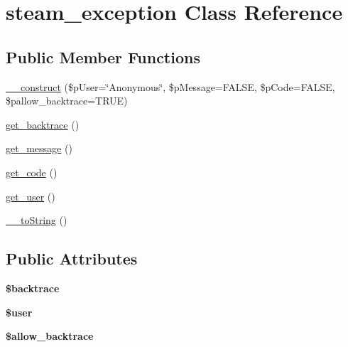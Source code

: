 \hypertarget{classsteam__exception}{
\section{steam\_\-exception Class Reference}
\label{classsteam__exception}
}
\subsection*{Public Member Functions}
\begin{DoxyCompactItemize}
\item 
\hyperlink{classsteam__exception_a3acc3ed126fa62c871ec35e678db876d}{\_\-\_\-construct} (\$pUser=\char`\"{}Anonymous\char`\"{}, \$pMessage=FALSE, \$pCode=FALSE, \$pallow\_\-backtrace=TRUE)
\item 
\hyperlink{classsteam__exception_a5af8080bfb7cc7e0e09e5b9cc16b5848}{get\_\-backtrace} ()
\item 
\hyperlink{classsteam__exception_a67d830615099fc1125170c48a2daa07d}{get\_\-message} ()
\item 
\hyperlink{classsteam__exception_a0074fc0ba75a922f200c7f9055a93eea}{get\_\-code} ()
\item 
\hyperlink{classsteam__exception_a3cc4a8d65c67e781fac2f4ddb3226c90}{get\_\-user} ()
\item 
\hyperlink{classsteam__exception_a1ffb1b692da88d70ef3fcb9c02358fcf}{\_\-\_\-toString} ()
\end{DoxyCompactItemize}
\subsection*{Public Attributes}
\begin{DoxyCompactItemize}
\item 
\hypertarget{classsteam__exception_adb1f9af82b59f0e15f14d2e8875829fb}{
{\bfseries \$backtrace}}
\label{classsteam__exception_adb1f9af82b59f0e15f14d2e8875829fb}

\item 
\hypertarget{classsteam__exception_ab421f55931c4b74af78b2f776d971c4c}{
{\bfseries \$user}}
\label{classsteam__exception_ab421f55931c4b74af78b2f776d971c4c}

\item 
\hypertarget{classsteam__exception_abb7ae866688a793fc6359b814e1960d6}{
{\bfseries \$allow\_\-backtrace}}
\label{classsteam__exception_abb7ae866688a793fc6359b814e1960d6}

\end{DoxyCompactItemize}


